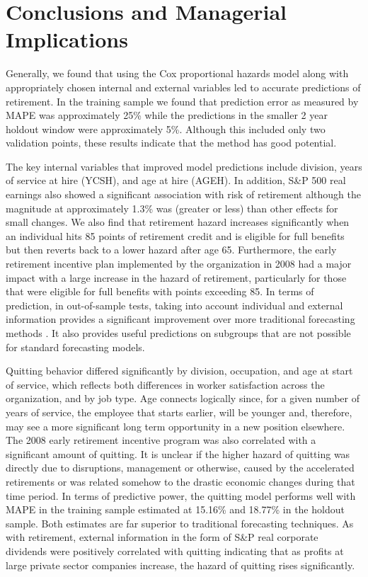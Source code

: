 \documentclass[12pt,letterpaper]{article}
\begin{document}
\section{Conclusions and Managerial Implications}

Generally, we found that using the Cox proportional hazards model along with appropriately chosen internal and external variables led to accurate predictions of retirement.  In the training sample we found that prediction error as measured by MAPE was approximately 25\% while the predictions in the smaller 2 year holdout window were approximately 5\%.  Although this included only two validation points, these results indicate that the method has good potential.

The key internal variables that improved model predictions include division, years of service at hire (YCSH), and age at hire (AGEH).  In addition, S\&P 500 real earnings also showed a significant association with risk of retirement although the magnitude at approximately 1.3\% was (greater or less) than other effects for small changes.  We also find that retirement hazard increases significantly when an individual hits 85 points of retirement credit and is eligible for full benefits but then reverts back to a lower hazard after age 65.  Furthermore, the early retirement incentive plan implemented by the organization in 2008 had a major impact with a large increase in the hazard of retirement, particularly for those that were eligible for full benefits with points exceeding 85.  In terms of prediction, in out-of-sample tests, taking into account individual and external information provides a significant improvement over more traditional forecasting methods \citet{feldman1994}.  It also provides useful predictions on subgroups that are not possible for standard forecasting models.

Quitting behavior differed significantly by division, occupation, and age at start of service, which reflects both differences in worker satisfaction across the organization, and by job type. Age connects logically since, for a given number of years of service, the employee that starts earlier, will be younger and, therefore, may see a more significant long term opportunity in a new position elsewhere.  The 2008 early retirement incentive program was also correlated with a significant amount of quitting.  It is unclear if the higher hazard of quitting was directly due to disruptions, management or otherwise, caused by the accelerated retirements or was related somehow to the drastic economic changes during that time period.  In terms of predictive power, the quitting model performs well with MAPE in the training sample estimated at 15.16\% and 18.77\% in the holdout sample.
Both estimates are far superior to traditional forecasting techniques.  As with retirement, external information in the form of S\&P real corporate dividends were positively correlated with quitting indicating that as profits at large private sector companies increase, the hazard of quitting rises significantly.
\end{document}
